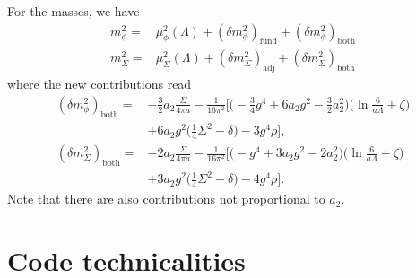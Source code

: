 \documentclass[11pt,a4paper]{article}
\begin{document}
For the masses, we have 
\begin{align}
m^2_\phi =& \mu^2_\phi(\Lambda) + (\delta m^2_\phi)_\text{fund}+ (\delta m^2_\phi)_\text{both} \\
m^2_\Sigma =& \mu^2_\Sigma(\Lambda) + (\delta m^2_\Sigma)_\text{adj} + (\delta m^2_\Sigma)_\text{both} 
\end{align}
where the new contributions read
\begin{align}
(\delta m^2_\phi)_\text{both} =& -\frac32 a_2 \frac{\Sigma}{4\pi a} - \frac{1}{16\pi^2} \Big[ \Big( -\frac34 g^4 + 6 a_2 g^2 - \frac32 a_2^2  \Big)\Big( \ln \frac{6}{a\Lambda}+\zeta \Big) \nonumber \\ 
& + 6 a_2 g^2 \Big( \frac14 \Sigma^2 - \delta \Big) - 3g^4 \rho \Big], \\
%
(\delta m^2_\Sigma)_\text{both} =& -2 a_2 \frac{\Sigma}{4\pi a} - \frac{1}{16\pi^2}\Big[ \Big( -g^4 + 3 a_2 g^2 - 2 a_2^2 \Big)\Big( \ln\frac{6}{a \Lambda} + \zeta \Big) \nonumber \\
&+ 3 a_2 g^2 \Big( \frac14 \Sigma^2 - \delta \Big) - 4 g^4 \rho \Big].
\end{align}
Note that there are also contributions not proportional to $a_2$.


\section{Code technicalities}
\end{document}
